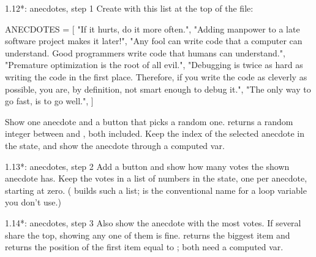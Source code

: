 \begin{exercise}{1.12*: anecdotes, step 1}
Create  with this list at the top of the file:

\begin{py}
ANECDOTES = [
	"If it hurts, do it more often.",
	"Adding manpower to a late software project makes it later!",
	"Any fool can write code that a computer can understand. Good programmers write code that humans can understand.",
	"Premature optimization is the root of all evil.",
	"Debugging is twice as hard as writing the code in the first place. Therefore, if you write the code as cleverly as possible, you are, by definition, not smart enough to debug it.",
	"The only way to go fast, is to go well.",
]
\end{py}

Show one anecdote and a button  that picks a random one.  returns a random integer between  and , both included. Keep the index of the selected anecdote in the state, and show the anecdote through a computed var.
\end{exercise}

\begin{exercise}{1.13*: anecdotes, step 2}
Add a  button and show how many votes the shown anecdote has. Keep the votes in a list of numbers in the state, one per anecdote, starting at zero. ( builds such a list; \cd{_} is the conventional name for a loop variable you don't use.)
\end{exercise}

\begin{exercise}{1.14*: anecdotes, step 3}
Also show the anecdote with the most votes. If several share the top, showing any one of them is fine.  returns the biggest item and  returns the position of the first item equal to ; both need a computed var.
\end{exercise}
